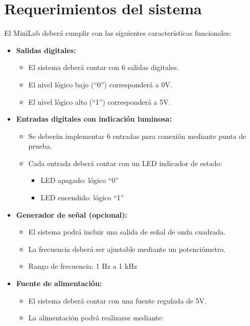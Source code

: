 \documentclass[12pt,a4paper]{article}
\begin{document}
\section{Requerimientos del sistema}
El MiniLab deberá cumplir con las siguientes características funcionales:

\begin{itemize}
    \item \textbf{Salidas digitales:}
        \begin{itemize}
            \item El sistema deberá contar con 6 salidas digitales.
            \item El nivel lógico bajo (“0”) corresponderá a 0V.
            \item El nivel lógico alto (“1”) corresponderá a 5V.
        \end{itemize}
    \item \textbf{Entradas digitales con indicación luminosa:}
        \begin{itemize}
            \item Se deberán implementar 6 entradas para conexión mediante punta de prueba.
            \item Cada entrada deberá contar con un LED indicador de estado: 
            \begin{itemize}
                \item LED apagado: lógico “0”
                \item LED encendido: lógico “1”
            \end{itemize}
        \end{itemize}
    \item \textbf{Generador de señal (opcional):}
        \begin{itemize}
            \item El sistema podrá incluir una salida de señal de onda cuadrada.
            \item La frecuencia deberá ser ajustable mediante un potenciómetro.
            \item Rango de frecuencia: 1 Hz a 1 kHz
        \end{itemize}
    \item \textbf{Fuente de alimentación:}
        \begin{itemize}
            \item El sistema deberá contar con una fuente regulada de 5V.
            \item La alimentación podrá realizarse mediante:
                \begin{itemize}

\end{itemize}
\end{itemize}
\end{itemize}
\end{document}
